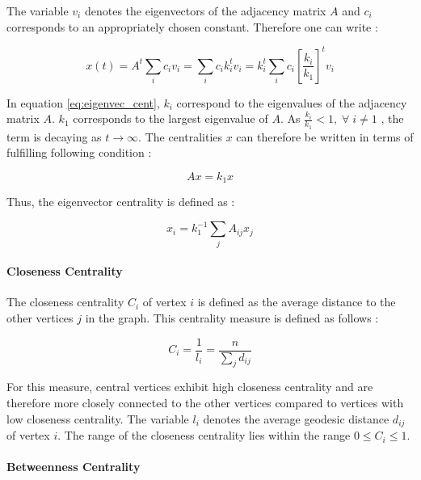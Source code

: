 	\noindent The variable $v_i$ denotes the eigenvectors of the adjacency 
	matrix $A$ and $c_i$ corresponds to an appropriately chosen constant. 
	Therefore one can write \citep[p. 170]{Newman2010}:

	\begin{equation}
		x(t) =  A^t \sum_{i}c_{i}v_{i} = \sum_{i} c_i k_i^t v_i = 
		k_i^t \sum_{i} c_i \left[\frac{k_i}{k_1}\right]^t v_i
		\label{eq:eigenvec_cent}
	\end{equation}

	\noindent In equation \ref{eq:eigenvec_cent}, $k_i$ correspond to the 
	eigenvalues of the adjacency matrix $A$. $k_1$ corresponds to the largest 
	eigenvalue of $A$. As $\frac{k_i}{k_1} < 1, \; \forall \; i\neq 1$ , the 
	term is decaying as $t \rightarrow \infty$. The centralities $x$ can 
	therefore be written in terms of fulfilling following condition 
	\citep[p. 170]{Newman2010}:

	\begin{equation}
		Ax = k_1 x	
	\end{equation}

	\noindent Thus, the eigenvector centrality is defined as 
	\citep[p. 170]{Newman2010}:

	\begin{equation}
		x_i = k_{1}^{-1} \sum_{j} A_{ij}x_j 
	\end{equation}

	\paragraph{Closeness Centrality} \mbox{}

	\noindent The closeness centrality $C_i$ of vertex $i$ is defined as the 
	average distance to the other vertices $j$ in the graph. This centrality 
	measure is defined as follows \citep[p. 182]{Newman2010}:

	\begin{equation}
		C_i = \frac{1}{l_i} = \frac{n}{\sum_{j}d_{ij}}
	\end{equation}

	\noindent For this measure, central vertices exhibit high closeness 
	centrality and are therefore more closely connected to the other vertices 
	compared to vertices with low closeness centrality. The variable $l_i$
	denotes the average geodesic distance $d_{ij}$ of vertex $i$. The range of
	the closeness centrality lies within the range $0\leqslant
	C_{i}\leqslant1$.

	\paragraph{Betweenness Centrality} \mbox{}

